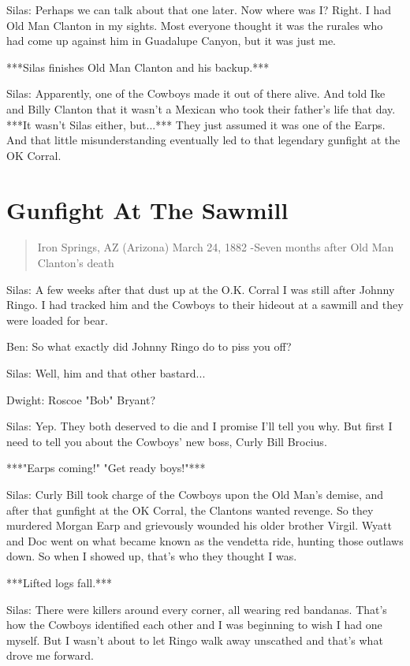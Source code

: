 \documentclass{article}
\begin{document}
Silas: Perhaps we can talk about that one later. Now where was I? Right. I had Old Man Clanton in my sights. Most everyone thought it was the rurales who had come up against him in Guadalupe Canyon, but it was just me.

***Silas finishes Old Man Clanton and his backup.***

Silas: Apparently, one of the Cowboys made it out of there alive. And told Ike and Billy Clanton that it wasn't a Mexican who took their father's life that day. ***It wasn't Silas either, but...*** They just assumed it was one of the Earps. And that little misunderstanding eventually led to that legendary gunfight at the OK Corral.

\section*{Gunfight At The Sawmill}

\begin{quote}
    Iron Springs, AZ (Arizona)
    March 24, 1882 -Seven months after Old Man Clanton's death
\end{quote}

Silas: A few weeks after that dust up at the O.K. Corral I was still after Johnny Ringo. I had tracked him and the Cowboys to their hideout at a sawmill and they were loaded for bear.

Ben: So what exactly did Johnny Ringo do to piss you off?

Silas: Well, him and that other bastard...

Dwight: Roscoe "Bob" Bryant?

Silas: Yep. They both deserved to die and I promise I'll tell you why. But first I need to tell you about the Cowboys' new boss, Curly Bill Brocius.

***"Earps coming!" "Get ready boys!"***

Silas: Curly Bill took charge of the Cowboys upon the Old Man's demise, and after that gunfight at the OK Corral, the Clantons wanted revenge. So they murdered Morgan Earp and grievously wounded his older brother Virgil. Wyatt and Doc went on what became known as the vendetta ride, hunting those outlaws down. So when I showed up, that's who they thought I was.

***Lifted logs fall.***

Silas: There were killers around every corner, all wearing red bandanas. That's how the Cowboys identified each other and I was beginning to wish I had one myself. But I wasn't about to let Ringo walk away unscathed and that's what drove me forward.
\end{document}
